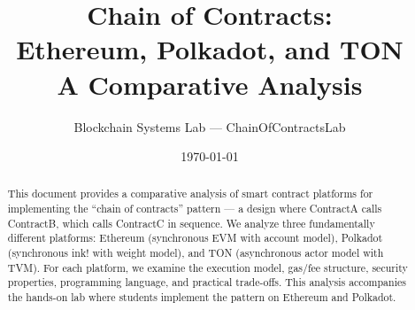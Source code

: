 \documentclass[11pt,a4paper]{article}
\title{Chain of Contracts: \\ Ethereum, Polkadot, and TON \\\large A Comparative Analysis}
\author{Blockchain Systems Lab --- ChainOfContractsLab}
\date{\today}
\begin{document}
\maketitle
\thispagestyle{empty}

\begin{abstract}
This document provides a comparative analysis of smart contract platforms for
implementing the ``chain of contracts'' pattern --- a design where ContractA
calls ContractB, which calls ContractC in sequence. We analyze three
fundamentally different platforms: Ethereum (synchronous EVM with account
model), Polkadot (synchronous ink! with weight model), and TON (asynchronous
actor model with TVM). For each platform, we examine the execution model,
gas/fee structure, security properties, programming language, and practical
trade-offs. This analysis accompanies the hands-on lab where students implement
the pattern on Ethereum and Polkadot.
\end{abstract}

\tableofcontents
\newpage







\newpage
\printbibliography
\end{document}
